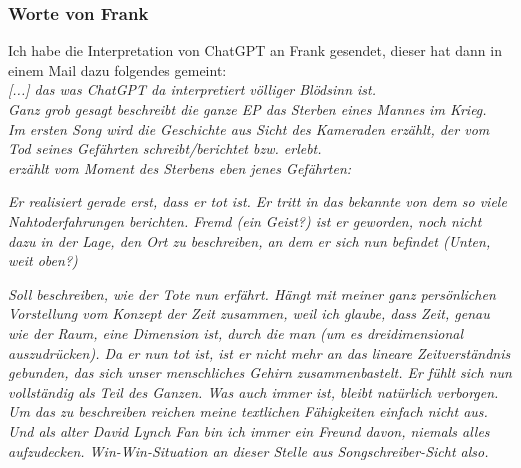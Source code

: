 \documentclass[twocolumn,10pt]{article}
\begin{document}
			\subsubsection{Worte von Frank}
			Ich habe die Interpretation von ChatGPT an Frank gesendet, dieser hat dann in einem Mail\cite{Mail} dazu folgendes gemeint:\\
			\textit{[...] das was ChatGPT da interpretiert völliger Blödsinn ist.}\\
			\textit{Ganz grob gesagt beschreibt die ganze EP  das Sterben eines Mannes im Krieg.}\\
			\textit{Im ersten Song  wird die Geschichte aus Sicht des Kameraden erzählt, der vom Tod seines Gefährten schreibt/berichtet bzw. erlebt.}\\
			\textit{ erzählt vom Moment des Sterbens eben jenes Gefährten:}
			\begin{center}
			\end{center}
			\textit{Er realisiert gerade erst, dass er tot ist. Er tritt in das bekannte  von dem so viele Nahtoderfahrungen berichten. Fremd (ein Geist?) ist er geworden, noch nicht dazu in der Lage, den Ort zu beschreiben, an dem er sich nun befindet (Unten, weit oben?)}
			\begin{center}
			\end{center}
			\textit{Soll beschreiben, wie der Tote nun  erfährt. Hängt mit meiner ganz persönlichen Vorstellung vom Konzept der Zeit zusammen, weil ich glaube, dass Zeit, genau wie der Raum, eine Dimension ist, durch die man  (um es dreidimensional auszudrücken). Da er nun tot ist, ist er nicht mehr an das lineare Zeitverständnis gebunden, das sich unser menschliches Gehirn zusammenbastelt. Er fühlt sich nun vollständig als Teil des Ganzen. Was auch immer  ist, bleibt natürlich verborgen. Um das zu beschreiben reichen meine textlichen Fähigkeiten einfach nicht aus. Und als alter David Lynch Fan bin ich immer ein Freund davon, niemals alles aufzudecken. Win-Win-Situation an dieser Stelle aus Songschreiber-Sicht also.}
\end{document}
